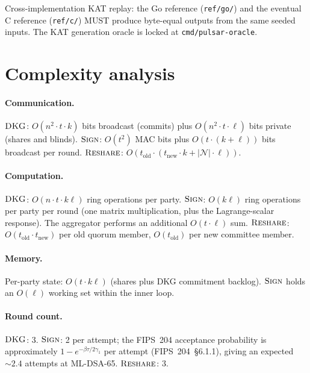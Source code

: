 \documentclass[11pt,a4paper]{article}
\theoremstyle{definition}
\theoremstyle{remark}
\newcommand{\Sign}{\textsc{Sign}}
\newcommand{\DKG}{\textsc{DKG}}
\newcommand{\Reshare}{\textsc{Reshare}}
\begin{document}
Cross-implementation KAT replay: the Go reference (\texttt{ref/go/})
and the eventual C reference (\texttt{ref/c/}) MUST produce
byte-equal outputs from the same seeded inputs. The KAT generation
oracle is locked at \texttt{cmd/pulsar-oracle}.

\section{Complexity analysis}
\label{sec:complexity}

\paragraph{Communication.}
$\DKG$: $O(n^2 \cdot t \cdot k)$ bits broadcast (commits) plus
$O(n^2 \cdot t \cdot \ell)$ bits private (shares and blinds).
$\Sign$: $O(t^2)$ MAC bits plus $O(t \cdot (k + \ell))$ bits
broadcast per round. $\Reshare$: $O(t_{\mathrm{old}} \cdot
(t_{\mathrm{new}} \cdot k + |\mathcal{N}| \cdot \ell))$.

\paragraph{Computation.}
$\DKG$: $O(n \cdot t \cdot k\ell)$ ring operations per party.
$\Sign$: $O(k\ell)$ ring operations per party per round (one matrix
multiplication, plus the Lagrange-scalar response). The aggregator
performs an additional $O(t \cdot \ell)$ sum.
$\Reshare$: $O(t_{\mathrm{old}} \cdot t_{\mathrm{new}})$ per old quorum
member, $O(t_{\mathrm{old}})$ per new committee member.

\paragraph{Memory.}
Per-party state: $O(t \cdot k\ell)$ (shares plus DKG commitment
backlog). $\Sign$ holds an $O(\ell)$ working set within the inner
loop.

\paragraph{Round count.}
$\DKG$: 3. $\Sign$: 2 per attempt; the FIPS~204 acceptance
probability is approximately $1 - e^{-\beta\tau/2\gamma_1}$ per
attempt (FIPS~204~\S6.1.1), giving an expected $\sim 2.4$ attempts at
ML-DSA-65. $\Reshare$: 3.
\end{document}
